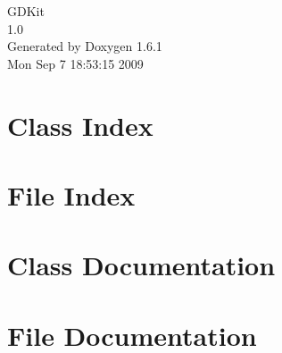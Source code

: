 \documentclass[a4paper]{book}
\begin{document}
\hypersetup{pageanchor=false}
\begin{titlepage}
\vspace*{7cm}
\begin{center}
{\Large GDKit \\[1ex]\large 1.0 }\\
\vspace*{1cm}
{\large Generated by Doxygen 1.6.1}\\
\vspace*{0.5cm}
{\small Mon Sep 7 18:53:15 2009}\\
\end{center}
\end{titlepage}
\clearemptydoublepage
{}
\tableofcontents
\clearemptydoublepage
{}
\hypersetup{pageanchor=true}
\chapter{Class Index}

\chapter{File Index}

\chapter{Class Documentation}

















\chapter{File Documentation}














\printindex
\end{document}

